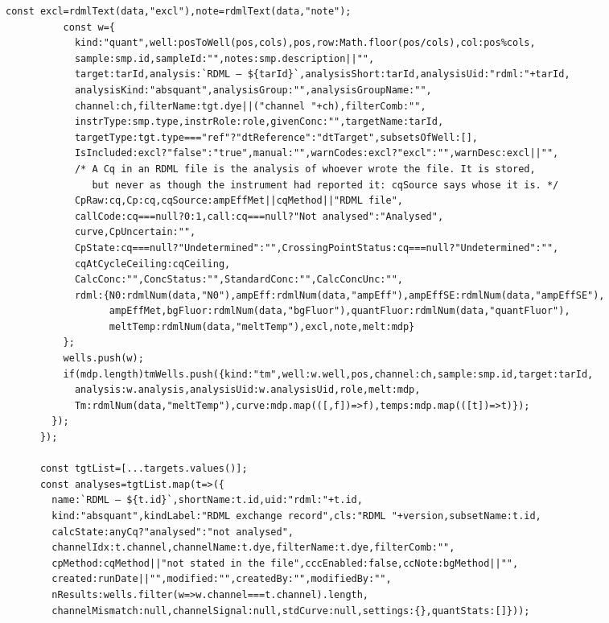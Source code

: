 \begin{multicols}{2}
\begin{lstlisting}[style=jstiny]
          const excl=rdmlText(data,"excl"),note=rdmlText(data,"note");
          const w={
            kind:"quant",well:posToWell(pos,cols),pos,row:Math.floor(pos/cols),col:pos%cols,
            sample:smp.id,sampleId:"",notes:smp.description||"",
            target:tarId,analysis:`RDML — ${tarId}`,analysisShort:tarId,analysisUid:"rdml:"+tarId,
            analysisKind:"absquant",analysisGroup:"",analysisGroupName:"",
            channel:ch,filterName:tgt.dye||("channel "+ch),filterComb:"",
            instrType:smp.type,instrRole:role,givenConc:"",targetName:tarId,
            targetType:tgt.type==="ref"?"dtReference":"dtTarget",subsetsOfWell:[],
            IsIncluded:excl?"false":"true",manual:"",warnCodes:excl?"excl":"",warnDesc:excl||"",
            /* A Cq in an RDML file is the analysis of whoever wrote the file. It is stored,
               but never as though the instrument had reported it: cqSource says whose it is. */
            CpRaw:cq,Cp:cq,cqSource:ampEffMet||cqMethod||"RDML file",
            callCode:cq===null?0:1,call:cq===null?"Not analysed":"Analysed",
            curve,CpUncertain:"",
            CpState:cq===null?"Undetermined":"",CrossingPointStatus:cq===null?"Undetermined":"",
            cqAtCycleCeiling:cqCeiling,
            CalcConc:"",ConcStatus:"",StandardConc:"",CalcConcUnc:"",
            rdml:{N0:rdmlNum(data,"N0"),ampEff:rdmlNum(data,"ampEff"),ampEffSE:rdmlNum(data,"ampEffSE"),
                  ampEffMet,bgFluor:rdmlNum(data,"bgFluor"),quantFluor:rdmlNum(data,"quantFluor"),
                  meltTemp:rdmlNum(data,"meltTemp"),excl,note,melt:mdp}
          };
          wells.push(w);
          if(mdp.length)tmWells.push({kind:"tm",well:w.well,pos,channel:ch,sample:smp.id,target:tarId,
            analysis:w.analysis,analysisUid:w.analysisUid,role,melt:mdp,
            Tm:rdmlNum(data,"meltTemp"),curve:mdp.map(([,f])=>f),temps:mdp.map(([t])=>t)});
        });
      });

      const tgtList=[...targets.values()];
      const analyses=tgtList.map(t=>({
        name:`RDML — ${t.id}`,shortName:t.id,uid:"rdml:"+t.id,
        kind:"absquant",kindLabel:"RDML exchange record",cls:"RDML "+version,subsetName:t.id,
        calcState:anyCq?"analysed":"not analysed",
        channelIdx:t.channel,channelName:t.dye,filterName:t.dye,filterComb:"",
        cpMethod:cqMethod||"not stated in the file",cccEnabled:false,ccNote:bgMethod||"",
        created:runDate||"",modified:"",createdBy:"",modifiedBy:"",
        nResults:wells.filter(w=>w.channel===t.channel).length,
        channelMismatch:null,channelSignal:null,stdCurve:null,settings:{},quantStats:[]}));


\end{lstlisting}
\end{multicols}
